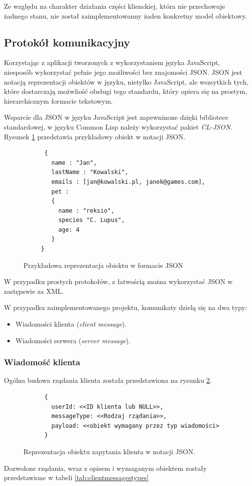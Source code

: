 Ze względu na charakter działania części klienckiej, która nie przechowuje żadnego stanu, nie został zaimplementowanny żaden konkretny model obiektowy.

\subsection{Protokół komunikacyjny}

Korzystając z aplikacji tworzonych z wykorzystaniem języka JavaScript, niesposób wykorzystać pełnie jego możliwości bez znajomości JSON. JSON jest notacją reprezentacji obiektów w języku, nietylko JavaScript, ale wszsytkich tych, które dostarczają możwliość obsługi tego standardu, który opiera się na prostym, hierarchicznym formacie tekstowym.

Wsparcie dla JSON w języku JavaScript jest zapewninone dzięki bibliotece standardowej, w języku Common Lisp należy wykorzystać pakiet \emph{CL-JSON}. Rysunek \ref{fig:jsonexample} przedstawia przykładowy obiekt w notacji JSON.
\begin{figure}[ht]
    \centering
    \begin{verbatim}
      {
        name : "Jan",
        lastName : "Kowalski",
        emails : [jan@kowalski.pl, janek@games.com],
        pet :
        {
          name : "reksio",
          species "C. Lupus",
          age: 4
        }
     }
      \end{verbatim}
    \caption{Przykładowa reprezentacja obiektu w formacie JSON}
    \label{fig:jsonexample}
\end{figure}
W przypadku prostych protokołów, z łatwością można wykorzystać JSON w zastępswie za XML.

W przypadku zaimplementowanego projektu, komunikaty dzielą się na dwa typy:
\begin{itemize}
  \item Wiadomości klienta (\emph{client message}).
  \item Wiadomości serwera (\emph{server message}).
\end{itemize}

\subsubsection{Wiadomość klienta}
Ogólna budowa rządania klienta została przedstawiona na rysunku \ref{fig:jsonclient}.
\begin{figure}[ht]
    \centering
    \begin{verbatim}
      {
        userId: <<ID klienta lub NULL>>,
        messageType: <<Rodzaj rządania>>,
        payload: <<obiekt wymagany przez typ wiadomości>
      }
      \end{verbatim}
    \caption{Reprezentacja obiektu zapytania klienta w notacji JSON.}
    \label{fig:jsonclient}
\end{figure}
Dozwolone rządania, wraz z opisem i wymaganym obiektem zostały przedstawione w tabeli \ref{tab:clientmessagestypes}

